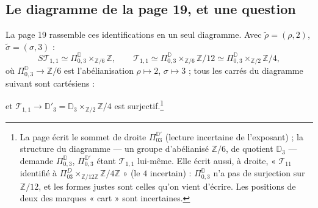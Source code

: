 \documentclass[11pt,a4paper]{article}
\begin{document}
\subsection*{Le diagramme de la page 19, et une question}

La page 19 rassemble ces identifications en un seul diagramme. Avec
$\tilde\rho = (\rho, 2)$, $\tilde\sigma = (\sigma, 3)$ :
\[
S\mathcal{T}_{1,1} \simeq \Pi^{\mathbb{D}}_{0,3} \times_{\mathbb{Z}/6} \mathbb{Z},
\qquad
\mathcal{T}_{1,1} \simeq \Pi^{\mathbb{D}}_{0,3} \times_{\mathbb{Z}/6} \mathbb{Z}/12
\simeq \Pi^{\mathbb{D}}_{0,3} \times_{\mathbb{Z}/2} \mathbb{Z}/4 ,
\]
où $\Pi^{\mathbb{D}}_{0,3} \to \mathbb{Z}/6$ est l'abélianisation $\rho \mapsto 2$,
$\sigma \mapsto 3$ ; tous les carrés du diagramme suivant sont cartésiens :


et $\mathcal{T}_{1,1} \to \mathbb{D}'_3 = \mathbb{D}_3 \times_{\mathbb{Z}/2}
\mathbb{Z}/4$ est surjectif.\footnote{La page écrit le sommet de droite
$\Pi^{\mathbb{D}'}_{03}$ (lecture incertaine de l'exposant) ; la structure du
diagramme — un groupe d'abélianisé $\mathbb{Z}/6$, de quotient $\mathbb{D}_3$ —
demande $\Pi^{\mathbb{D}}_{0,3}$, $\Pi^{\mathbb{D}'}_{0,3}$ étant
$\mathcal{T}_{1,1}$ lui-même. Elle écrit aussi, à droite, « $\mathcal{T}_{11}$
identifié à $\Pi^{D}_{03} \times_{\mathbb{Z}/12\mathbb{Z}} \mathbb{Z}/4\mathbb{Z}$ »
(le $4$ incertain) : $\Pi^{\mathbb{D}}_{0,3}$ n'a pas de surjection sur
$\mathbb{Z}/12$, et les formes justes sont celles qu'on vient d'écrire. Les
positions de deux des marques « cart » sont incertaines.}
\end{document}
